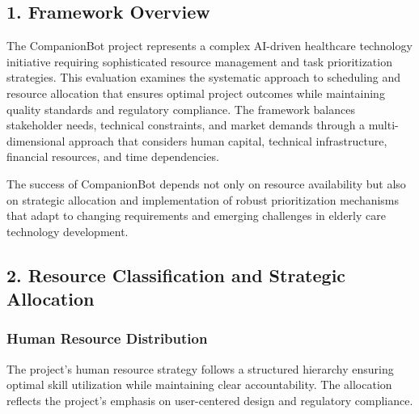 \documentclass[
  letterpaper,
  DIV=11,
  numbers=noendperiod]{scrartcl}
\begin{document}
\subsection{1. Framework Overview}\label{framework-overview}

The CompanionBot project represents a complex AI-driven healthcare
technology initiative requiring sophisticated resource management and
task prioritization strategies. This evaluation examines the systematic
approach to scheduling and resource allocation that ensures optimal
project outcomes while maintaining quality standards and regulatory
compliance. The framework balances stakeholder needs, technical
constraints, and market demands through a multi-dimensional approach
that considers human capital, technical infrastructure, financial
resources, and time dependencies.

The success of CompanionBot depends not only on resource availability
but also on strategic allocation and implementation of robust
prioritization mechanisms that adapt to changing requirements and
emerging challenges in elderly care technology development.

\subsection{2. Resource Classification and Strategic
Allocation}\label{resource-classification-and-strategic-allocation}

\subsubsection{Human Resource
Distribution}\label{human-resource-distribution}

The project's human resource strategy follows a structured hierarchy
ensuring optimal skill utilization while maintaining clear
accountability. The allocation reflects the project's emphasis on
user-centered design and regulatory compliance.
\end{document}
